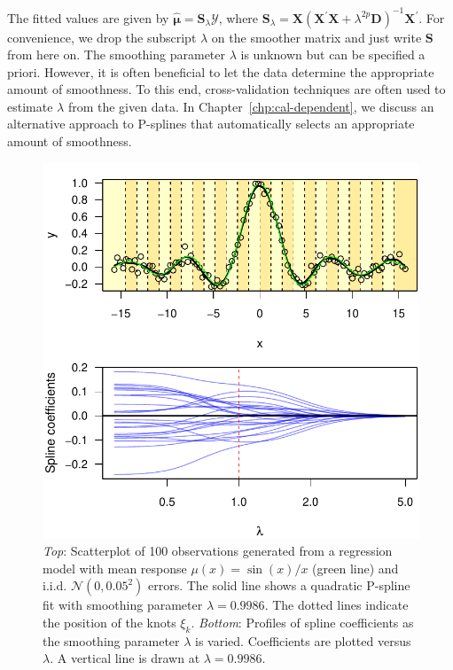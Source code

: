 \documentclass[cmfont,usenames,dvipsnames,leqno]{afit-etd}\usepackage[]{graphicx}\usepackage[]{color}
\makeatletter
\def\maxwidth{ %
  \ifdim\Gin@nat@width>\linewidth
    \linewidth
  \else
    \Gin@nat@width
  \fi
}
\newenvironment{knitrout}{}{} %
\renewenvironment{knitrout}{\begin{singlespace}}{\end{singlespace}}
\newcommand{\trans}{\ensuremath{^\prime}}
\newcommand{\bc}[1]{\ensuremath{\bm{\mathcal{#1}}}}
\newcommand{\mc}[1]{\ensuremath{\mathcal{#1}}}
\newcommand{\wh}[1]{\ensuremath{\widehat{#1}}}
\newcommand{\X}{\ensuremath{\bm{X}}}
\makeatother
\begin{document}
The fitted values are given by $\wh{\bm{\mu}} = \bm{S}_\lambda \bc{Y}$, where $\bm{S}_\lambda = \X\left( \X\trans\X + \lambda^{2p}\bm{D} \right)^{-1}\X\trans$. For convenience, we drop the subscript $\lambda$ on the smoother matrix and just write $\bm{S}$ from here on. The smoothing parameter $\lambda$ is unknown but can be specified a priori. However, it is often beneficial to let the data determine the appropriate amount of smoothness. To this end, cross-validation techniques are often used to estimate $\lambda$ from the given data. In Chapter~\ref{chp:cal-dependent}, we discuss an alternative approach to \ac{P-spline}s that automatically selects an appropriate amount of smoothness.

\begin{knitrout}
\color{fgcolor}\begin{figure}[!htb]

\includegraphics[width=\maxwidth]{figure/sin-example} \caption[Unnormalized sinc function]{\textit{Top}: Scatterplot of 100 observations generated from a regression model with mean response $\mu(x) = \sin(x)/x$ (green line) and i.i.d. $\mc{N}(0, 0.05^2)$ errors. The solid line shows a quadratic \ac{P-spline} fit with smoothing parameter $\lambda = 0.9986$. The dotted lines indicate the position of the knots $\xi_k$. \textit{Bottom}: Profiles of spline coefficients as the smoothing parameter $\lambda$ is varied. Coefficients are plotted versus $\lambda$. A vertical line is drawn at $\lambda = 0.9986$.\label{fig:sin-example}}
\end{figure}


\end{knitrout}
\end{document}
